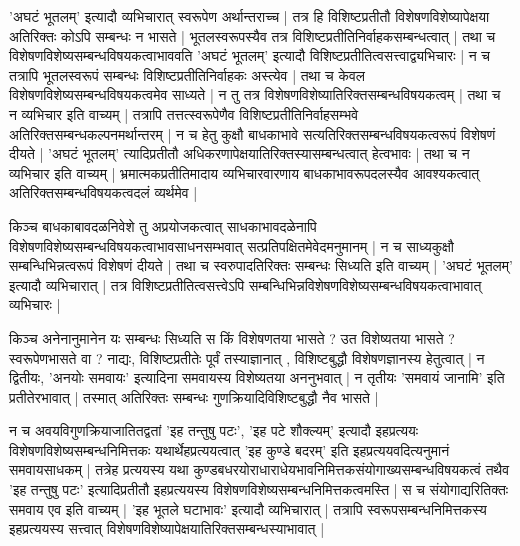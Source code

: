 'अघटं भूतलम्' इत्यादौ व्यभिचारात् स्वरूपेण अर्थान्तराच्च | तत्र हि विशिष्टप्रतीतौ विशेषणविशेष्यापेक्षया अतिरिक्तः कोऽपि सम्बन्धः‌ न भासते | भूतलस्वरूपस्यैव तत्र विशिष्टप्रतीतिनिर्वाहकसम्बन्धत्वात् | तथा च विशेषणविशेष्यसम्बन्धविषयकत्वाभाववति 'अघटं भूतलम्' इत्यादौ विशिष्टप्रतीतित्वसत्त्वाद्व्यभिचारः | न च तत्रापि भूतलस्वरूपं सम्बन्धः विशिष्टप्रतीतिनिर्वाहकः अस्त्येव | तथा च केवल विशेषणविशेष्यसम्बन्धविषयकत्वमेव साध्यते | न तु तत्र विशेषणविशेष्यातिरिक्तसम्बन्धविषयकत्वम् | तथा च न व्यभिचार इति वाच्यम् | तत्रापि तत्तत्स्वरूपेणैव विशिष्टप्रतीतिनिर्वाहसम्भवे अतिरिक्तसम्बन्धकल्पनमर्थान्तरम् | न च हेतु कुक्षौ बाधकाभावे सत्यतिरिक्तसम्बन्धविषयकत्वरूपं विशेषणं दीयते | 'अघटं भूतलम्' त्यादिप्रतीतौ अधिकरणापेक्षयातिरिक्तस्यासम्बन्धत्वात् हेत्वभावः | तथा च न व्यभिचार इति वाच्यम् | भ्रमात्मकप्रतीतिमादाय व्यभिचारवारणाय बाधकाभावरूपदलस्यैव आवश्यकत्वात् अतिरिक्तसम्बन्धविषयकत्वदलं व्यर्थमेव | 

किञ्च बाधकाबावदळनिवेशे तु अप्रयोजकत्वात् साधकाभावदळेनापि विशेषणविशेष्यसम्बन्धविषयकत्वाभावसाधनसम्भवात् सत्प्रतिपक्षितमेवेदमनुमानम् | न च साध्यकुक्षौ सम्बन्धिभिन्नत्वरूपं विशेषणं दीयते | तथा च स्वरुपादतिरिक्तः सम्बन्धः सिध्यति इति वाच्यम् | 'अघटं भूतलम्' इत्यादौ व्यभिचारात् | तत्र विशिष्टप्रतीतित्वसत्त्वेऽपि सम्बन्धिभिन्नविशेषणविशेष्यसम्बन्धविषयकत्वाभावात् व्यभिचारः |

किञ्च अनेनानुमानेन यः सम्बन्धः सिध्यति स किं विशेषणतया भासते ? उत विशेष्यतया भासते ? स्वरूपेणभासते वा ? नाद्यः, विशिष्टप्रतीतेः पूर्वं तस्याज्ञानात् , विशिष्टबुद्धौ विशेषणज्ञानस्य हेतुत्वात् | न द्वितीयः, 'अनयोः समवायः' इत्यादिना समवायस्य विशेष्यतया अननुभवात् | न तृतीयः 'समवायं जानामि' इति प्रतीतेरभावात् | तस्मात् अतिरिक्तः सम्बन्धः गुणक्रियादिविशिष्टबुद्धौ नैव भासते | 

न च अवयविगुणक्रियाजातितद्वतां 'इह तन्तुषु पटः', 'इह पटे शौक्ल्यम्' इत्यादौ इहप्रत्ययः विशेषणविशेष्यसम्बन्धनिमित्तकः यथार्थेहप्रत्ययत्वात् 'इह कुण्डे बदरम्' इति इहप्रत्ययवदित्यनुमानं समवायसाधकम् | तत्रेह प्रत्ययस्य यथा कुण्डबधरयोराधाराधेयभावनिमित्तकसंयोगाख्यसम्बन्धविषयकत्वं तथैव 'इह तन्तुषु पटः' इत्यादिप्रतीतौ इहप्रत्ययस्य विशेषणविशेष्यसम्बन्धनिमित्तकत्वमस्ति | स च संयोगाद्यरितिक्तः समवाय एव इति वाच्यम् | 'इह भूतले घटाभावः' इत्यादौ व्यभिचारात् | तत्रापि स्वरूपसम्बन्धनिमित्तकस्य इहप्रत्ययस्य सत्त्वात् विशेषणविशेष्यापेक्षयातिरिक्तसम्बन्धस्याभावात् | 

